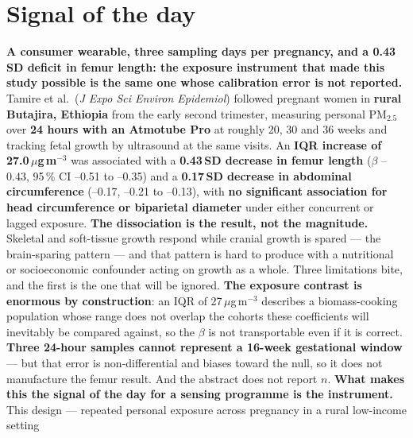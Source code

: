 \documentclass[10pt]{article}
\begin{document}
\vspace{6mm}

\section*{\sffamily\bfseries\color{Deep}Signal of the day}
\vspace{-1.5mm}{\color{Amber}\rule{\linewidth}{1.1pt}}\vspace{2.5mm}

\begin{keybox}
{\sffamily\bfseries\small\color{Deep}A consumer wearable, three sampling days per
pregnancy, and a 0.43\,SD deficit in femur length: the exposure instrument that made this
study possible is the same one whose calibration error is not reported.}\\[1.4mm]
\footnotesize
Tamire et al.\ (\textit{J Expo Sci Environ Epidemiol}) followed pregnant women in
\textbf{rural Butajira, Ethiopia} from the early second trimester, measuring personal
PM$_{2.5}$ over \textbf{24 hours with an Atmotube Pro} at roughly 20, 30 and 36 weeks and
tracking fetal growth by ultrasound at the same visits. An \textbf{IQR increase of
27.0\,$\mu$g\,m$^{-3}$} was associated with a \textbf{0.43\,SD decrease in femur length}
($\beta$ --0.43, 95\,\% CI --0.51 to --0.35) and a \textbf{0.17\,SD decrease in abdominal
circumference} (--0.17, --0.21 to --0.13), with \textbf{no significant association for head
circumference or biparietal diameter} under either concurrent or lagged exposure.
\textbf{The dissociation is the result, not the magnitude.} Skeletal and soft-tissue growth
respond while cranial growth is spared --- the brain-sparing pattern --- and that pattern is
hard to produce with a nutritional or socioeconomic confounder acting on growth as a whole.
Three limitations bite, and the first is the one that will be ignored. \textbf{The exposure
contrast is enormous by construction}: an IQR of 27\,$\mu$g\,m$^{-3}$ describes a
biomass-cooking population whose range does not overlap the cohorts these coefficients will
inevitably be compared against, so the $\beta$ is not transportable even if it is correct.
\textbf{Three 24-hour samples cannot represent a 16-week gestational window} --- but that
error is non-differential and biases toward the null, so it does not manufacture the femur
result. And the abstract does not report $n$.
\textbf{What makes this the signal of the day for a sensing programme is the instrument.}
This design --- repeated personal exposure across pregnancy in a rural low-income setting

\end{keybox}
\end{document}
